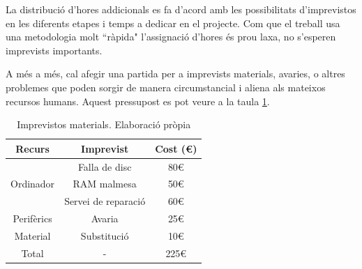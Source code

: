 \documentclass[a4paper]{report}
\begin{document}
	La distribució d'hores addicionals es fa d'acord amb les possibilitats d'imprevistos en les diferents etapes i temps a dedicar en el projecte. Com que el treball usa una metodologia molt ``ràpida"  l'assignació d'hores és prou laxa, no s'esperen imprevists importants.
	\par 
	A més a més, cal afegir una partida per a imprevists materials, avaries, o altres problemes que poden sorgir de manera circumstancial i aliena als mateixos recursos humans. Aquest pressupost es pot veure  a la taula \ref{table:imprevistosM}.
	\begin{table}
		\centering
		\begin{tabular}{|| c || c | c ||}
			\hline
			\textbf{Recurs} & \textbf{Imprevist} & \textbf{Cost (\euro)} \\
			\hline\hline
			\multirow{3}{*}{Ordinador} & 
					Falla de disc & 80\euro \\
					&RAM malmesa  &  50\euro \\
					&Servei de reparació 	 & 60\euro\\
			\hline 
			Perifèrics & Avaria & 25\euro\\
			\hline
			Material & Substitució & 10\euro \\
			\hline \hline
			Total & - & 225\euro \\
			\hline
		\end{tabular}
		\caption[Imprevistos materials]{Imprevistos materials. Elaboració pròpia}
		\label{table:imprevistosM}
	\end{table}
	
\end{document}

